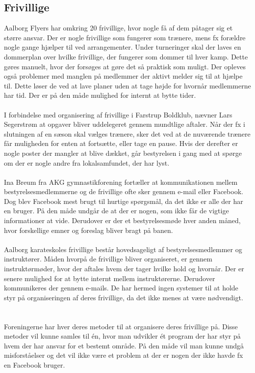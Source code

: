 \subsection*{Frivillige}
Aalborg Flyers har omkring 20 frivillige, hvor nogle få af dem påtager sig et større ansvar. Der er nogle frivillige som fungerer som trænere, mens fx forældre nogle gange hjælper til ved arrangementer. Under turneringer skal der laves en dommerplan over hvilke frivillige, der fungerer som dommer til hver kamp. Dette gøres manuelt, hvor der forsøges at gøre det så praktisk som muligt. Der opleves også problemer med manglen på medlemmer der aktivt melder sig til at hjælpe til. Dette løser de ved at lave planer uden at tage højde for hvornår medlemmerne har tid. Der er på den måde mulighed for internt at bytte tider.
\\\\
I forbindelse med organisering af frivillige i Farstrup Boldklub, nævner Lars Segerstrøm at opgaver bliver uddelegeret gennem mundtlige aftaler. Når der fx i slutningen af en sæson skal vælges trænere, sker det ved at de nuværende trænere får muligheden for enten at fortsætte, eller tage en pause. Hvis der derefter er nogle poster der mangler at blive dækket, går bestyrelsen i gang med at spørge om der er nogle andre fra lokalsamfundet, der har lyst.
\\\\
Ina Breum fra AKG gymnastikforening fortæller at kommunikationen mellem bestyrelsesmedlemmerne og de frivillige ofte sker gennem e-mail eller Facebook. Dog blev Facebook mest brugt til hurtige spørgsmål, da det ikke er alle der har en bruger. På den måde undgår de at der er nogen, som ikke får de vigtige informationer at vide. Derudover er der et bestyrelsesmøde hver anden måned, hvor forskellige emner og foreslag bliver bragt på banen.
\\\\ %
Aalborg karateskoles frivillige består hovedsageligt af bestyrelsesmedlemmer og instruktører. Måden hvorpå de frivillige bliver organiseret, er gennem instruktørmøder, hvor der aftales hvem der tager hvilke hold og hvornår. Der er senere mulighed for at bytte internt mellem instruktørerne. Derudover kommunikeres der gennem e-mails. De har hermed ingen systemer til at holde styr på organiseringen af deres frivillige, da det ikke menes at være nødvendigt.
\\\\\\
Foreningerne har hver deres metoder til at organisere deres frivillige på. Disse metoder vil kunne samles til én, hvor man udvikler ét program der har styr på hvem der har ansvar for et bestemt område. På den måde vil man kunne undgå misforståelser og det vil ikke være et problem at der er nogen der ikke havde fx en Facebook bruger. 


